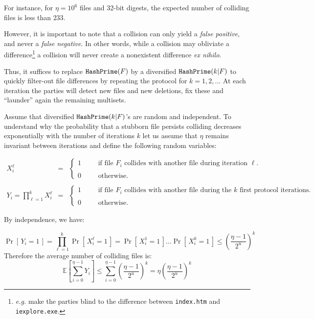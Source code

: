\documentclass[11pt]{llncs}
\newcommand{\Prob}[1]{{\Pr\left[\,{#1}\,\right]}}
\newcommand{\EE}[1]{{\mathbb{E}\left[{#1}\right]}}
\begin{document}
For instance, for $\eta=10^6$ files and 32-bit digests, the expected number of colliding files is less than $233$.\smallskip

However, it is important to note that a collision can only yield a {\sl false positive}, and never a {\sl false negative}. In other words, while a collision may obliviate a difference\footnote{{\sl e.g.} make the parties blind to the difference between {\tt index.htm} and {\tt iexplore.exe}.} a collision will never create a nonexistent difference {\sl ex nihilo}.\smallskip

Thus, it suffices to replace $\mbox{{\tt HashPrime}}(F)$ by a diversified $\mbox{{\tt HashPrime}}(k|F)$ to quickly filter-out file differences by repeating the protocol for $k=1,2,\ldots$ At each iteration the parties will detect new files and new deletions, fix these and ``launder'' again the remaining multisets.\smallskip

Assume that diversified $\mbox{{\tt HashPrime}}(k|F)$'s are random and independent. To understand why the probability that a stubborn file persists colliding decreases exponentially with the number of iterations $k$ let us assume that $\eta$ remains invariant between iterations and define the following random variables:\smallskip

$$
\begin{array}{rcl}
X^{\ell}_i & = &
\left\{
\begin{array}{lcl}
1 & ~~~~&  \mbox{if file $F_i$ collides with another file during iteration $\ell$.}\\
\\
0 & ~~~~&  \mbox{otherwise.}
\end{array}
\right.\\
\\
Y_i = \prod_{\ell=1}^k X^{\ell}_i & = &
\left\{
\begin{array}{lcl}
1 & ~~~~&  \mbox{if file $F_i$ collides with another file during the $k$ first protocol iterations.}\\
\\
0 & ~~~~&  \mbox{otherwise.}
\end{array}
\right.
\end{array}$$

By independence, we have:

 \[ \Prob{Y_i = 1} = \prod_{\ell=1}^k \Prob{X^{\ell}_i = 1} = \Prob{X^1_i = 1} \dots \Prob{X^k_i = 1} \le \left( \frac{\eta -1}{2^u} \right)^k \]
Therefore the average number of colliding files is:
\[
 \EE{\sum_{i=0}^{\eta-1} Y_i} \le \sum_{i=0}^{\eta-1} \left( \frac{\eta -1}{2^u} \right)^k =  \eta \left(\frac{\eta - 1}{2^u}\right)^k
\]
\end{document}
